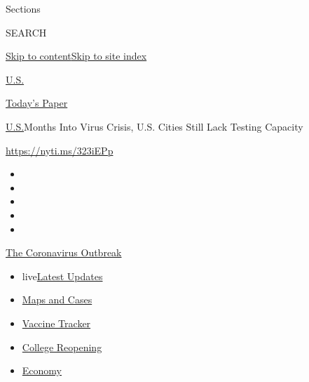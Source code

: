 Sections

SEARCH

\protect\hyperlink{site-content}{Skip to
content}\protect\hyperlink{site-index}{Skip to site index}

\href{https://www.nytimes3xbfgragh.onion/section/us}{U.S.}

\href{https://myaccount.nytimes3xbfgragh.onion/auth/login?response_type=cookie\&client_id=vi}{}

\href{https://www.nytimes3xbfgragh.onion/section/todayspaper}{Today's
Paper}

\href{/section/us}{U.S.}\textbar{}Months Into Virus Crisis, U.S. Cities
Still Lack Testing Capacity

\url{https://nyti.ms/323iEPp}

\begin{itemize}
\item
\item
\item
\item
\item
\end{itemize}

\href{https://www.nytimes3xbfgragh.onion/news-event/coronavirus?action=click\&pgtype=Article\&state=default\&region=TOP_BANNER\&context=storylines_menu}{The
Coronavirus Outbreak}

\begin{itemize}
\tightlist
\item
  live\href{https://www.nytimes3xbfgragh.onion/2020/08/04/world/coronavirus-cases.html?action=click\&pgtype=Article\&state=default\&region=TOP_BANNER\&context=storylines_menu}{Latest
  Updates}
\item
  \href{https://www.nytimes3xbfgragh.onion/interactive/2020/us/coronavirus-us-cases.html?action=click\&pgtype=Article\&state=default\&region=TOP_BANNER\&context=storylines_menu}{Maps
  and Cases}
\item
  \href{https://www.nytimes3xbfgragh.onion/interactive/2020/science/coronavirus-vaccine-tracker.html?action=click\&pgtype=Article\&state=default\&region=TOP_BANNER\&context=storylines_menu}{Vaccine
  Tracker}
\item
  \href{https://www.nytimes3xbfgragh.onion/2020/08/02/us/covid-college-reopening.html?action=click\&pgtype=Article\&state=default\&region=TOP_BANNER\&context=storylines_menu}{College
  Reopening}
\item
  \href{https://www.nytimes3xbfgragh.onion/live/2020/08/04/business/stock-market-today-coronavirus?action=click\&pgtype=Article\&state=default\&region=TOP_BANNER\&context=storylines_menu}{Economy}
\end{itemize}

